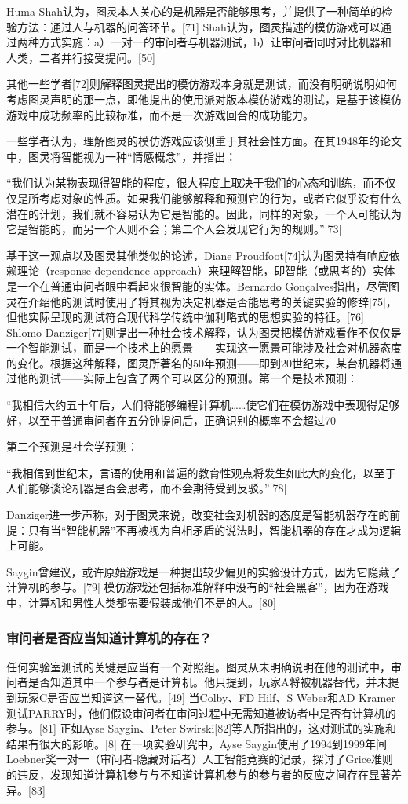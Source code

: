 Huma Shah认为，图灵本人关心的是机器是否能够思考，并提供了一种简单的检验方法：通过人与机器的问答环节。[71] Shah认为，图灵描述的模仿游戏可以通过两种方式实施：a）一对一的审问者与机器测试，b）让审问者同时对比机器和人类，二者并行接受提问。[50]

其他一些学者[72]则解释图灵提出的模仿游戏本身就是测试，而没有明确说明如何考虑图灵声明的那一点，即他提出的使用派对版本模仿游戏的测试，是基于该模仿游戏中成功频率的比较标准，而不是一次游戏回合的成功能力。

一些学者认为，理解图灵的模仿游戏应该侧重于其社会性方面。在其1948年的论文中，图灵将智能视为一种“情感概念”，并指出：

“我们认为某物表现得智能的程度，很大程度上取决于我们的心态和训练，而不仅仅是所考虑对象的性质。如果我们能够解释和预测它的行为，或者它似乎没有什么潜在的计划，我们就不容易认为它是智能的。因此，同样的对象，一个人可能认为它是智能的，而另一个人则不会；第二个人会发现它行为的规则。”[73]

基于这一观点以及图灵其他类似的论述，Diane Proudfoot[74]认为图灵持有响应依赖理论（response-dependence approach）来理解智能，即智能（或思考的）实体是一个在普通审问者眼中看起来很智能的实体。Bernardo Gonçalves指出，尽管图灵在介绍他的测试时使用了将其视为决定机器是否能思考的关键实验的修辞[75]，但他实际呈现的测试符合现代科学传统中伽利略式的思想实验的特征。[76] Shlomo Danziger[77]则提出一种社会技术解释，认为图灵把模仿游戏看作不仅仅是一个智能测试，而是一个技术上的愿景——实现这一愿景可能涉及社会对机器态度的变化。根据这种解释，图灵所著名的50年预测——即到20世纪末，某台机器将通过他的测试——实际上包含了两个可以区分的预测。第一个是技术预测：

“我相信大约五十年后，人们将能够编程计算机……使它们在模仿游戏中表现得足够好，以至于普通审问者在五分钟提问后，正确识别的概率不会超过70%

第二个预测是社会学预测：

“我相信到世纪末，言语的使用和普遍的教育性观点将发生如此大的变化，以至于人们能够谈论机器是否会思考，而不会期待受到反驳。”[78]

Danziger进一步声称，对于图灵来说，改变社会对机器的态度是智能机器存在的前提：只有当“智能机器”不再被视为自相矛盾的说法时，智能机器的存在才成为逻辑上可能。

Saygin曾建议，或许原始游戏是一种提出较少偏见的实验设计方式，因为它隐藏了计算机的参与。[79] 模仿游戏还包括标准解释中没有的“社会黑客”，因为在游戏中，计算机和男性人类都需要假装成他们不是的人。[80]
\subsubsection{审问者是否应当知道计算机的存在？}
任何实验室测试的关键是应当有一个对照组。图灵从未明确说明在他的测试中，审问者是否知道其中一个参与者是计算机。他只提到，玩家A将被机器替代，并未提到玩家C是否应当知道这一替代。[49] 当Colby、FD Hilf、S Weber和AD Kramer测试PARRY时，他们假设审问者在审问过程中无需知道被访者中是否有计算机的参与。[81] 正如Ayse Saygin、Peter Swirski[82]等人所指出的，这对测试的实施和结果有很大的影响。[8] 在一项实验研究中，Ayse Saygin使用了1994到1999年间Loebner奖一对一（审问者-隐藏对话者）人工智能竞赛的记录，探讨了Grice准则的违反，发现知道计算机参与与不知道计算机参与的参与者的反应之间存在显著差异。[83]